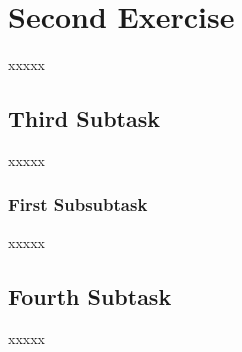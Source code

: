 \documentclass[a4paper, 11pt]{article} %
\begin{document}
\section{\textbf{Second Exercise}}
xxxxx

\subsection{\textbf{Third Subtask}}
xxxxx

\subsubsection{\textbf{First Subsubtask}}
xxxxx

\subsection{\textbf{Fourth Subtask}}
xxxxx

\bigskip



\end{document}
